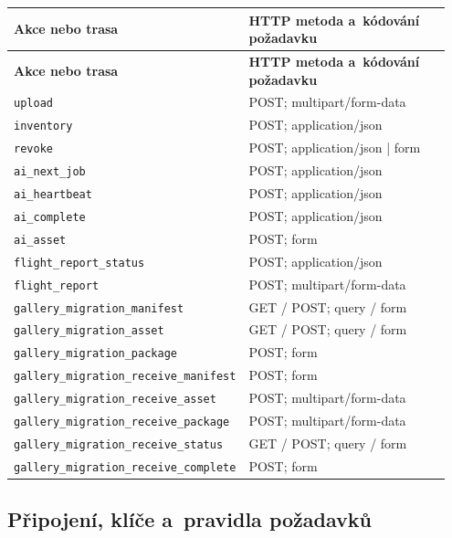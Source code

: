 \documentclass[11pt,a4paper]{article}
\newcommand{\codeword}[1]{\nolinkurl{#1}}
\begin{document}
\begin{longtable}{@{}>{\RaggedRight\arraybackslash}p{0.28\linewidth}>{\RaggedRight\arraybackslash}p{0.67\linewidth}@{}}
\toprule
\textbf{Akce nebo trasa} & \textbf{HTTP metoda a~kódování požadavku} \\
\midrule
\endfirsthead
\toprule
\textbf{Akce nebo trasa} & \textbf{HTTP metoda a~kódování požadavku} \\
\midrule
\endhead
\bottomrule
\endfoot
\codeword{upload} & POST; multipart/form-data \\
\codeword{inventory} & POST; application/json \\
\codeword{revoke} & POST; application/json | form \\
\codeword{ai_next_job} & POST; application/json \\
\codeword{ai_heartbeat} & POST; application/json \\
\codeword{ai_complete} & POST; application/json \\
\codeword{ai_asset} & POST; form \\
\codeword{flight_report_status} & POST; application/json \\
\codeword{flight_report} & POST; multipart/form-data \\
\codeword{gallery_migration_manifest} & GET / POST; query / form \\
\codeword{gallery_migration_asset} & GET / POST; query / form \\
\codeword{gallery_migration_package} & POST; form \\
\codeword{gallery_migration_receive_manifest} & POST; form \\
\codeword{gallery_migration_receive_asset} & POST; multipart/form-data \\
\codeword{gallery_migration_receive_package} & POST; multipart/form-data \\
\codeword{gallery_migration_receive_status} & GET / POST; query / form \\
\codeword{gallery_migration_receive_complete} & POST; form \\
\end{longtable}

\subsection{\texorpdfstring{Připojení, klíče a~pravidla požadavků}{Připojení, klíče a pravidla požadavků}}

\label{api352:connection}
\end{document}
